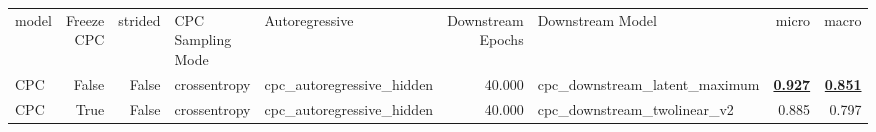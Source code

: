 \begin{adjustbox}{width=\textwidth}
\begin{tabular}{lrrllrlrr}
{model} & {Freeze CPC} & {strided} & {CPC Sampling Mode} & {Autoregressive} & {Downstream Epochs} & {Downstream Model} & {micro} & {macro} \\
CPC & False & False & crossentropy & cpc\_autoregressive\_hidden & 40.000 & cpc\_downstream\_latent\_maximum & \bfseries \underline{0.927} & \bfseries \underline{0.851} \\
CPC & True & False & crossentropy & cpc\_autoregressive\_hidden & 40.000 & cpc\_downstream\_twolinear\_v2 & 0.885 & 0.797 \\
\end{tabular}
\end{adjustbox}